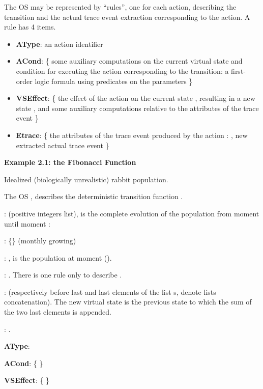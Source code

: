\vspace{2mm}

The OS may be represented by ``rules'', one for each action, describing the transition and the actual trace event extraction corresponding to the action. A rule has 4 items.

\vspace{0,5mm}
\begin{itemize}
\item {\bf AType}: an action identifier 
\item {\bf ACond}: \{ some auxiliary computations on the current virtual state and condition for executing the action corresponding to the transition: a first-order logic formula using predicates on the parameters \}
\item {\bf VSEffect}: \{ the effect of the action  on the current state , resulting in a new state  , and some auxiliary computations relative to the attributes of the trace event \}
\item {\bf Etrace}: \{ the attributes of the trace event produced by the action : , new extracted actual trace event \} 
\end{itemize}



\vspace{5mm}
{\bf Example 2.1: the Fibonacci Function}
\label{ex:fibo}

Idealized (biologically unrealistic) rabbit population.

\vspace{2mm}
The OS , describes the deterministic transition function .

\vspace{2mm}
:  (positive integers list),  is the complete evolution of the population from moment  until moment :  

: \{\} (monthly growing)  

: ,  is the population at moment  ().

: . There is one rule only to describe .

:  (respectively before last and last elements of the list s,  denote lists concatenation). The new virtual state  is the previous state to which the sum of the two last elements is appended.


: .



\vspace{1mm}
{\bf AType}: 

{\bf ACond}: \{ \}

{\bf VSEffect}:  \{  \}

